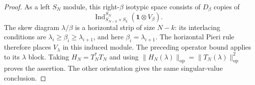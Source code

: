 \begin{proof}
As a left $S_N$ module, this right-$\beta$ isotypic space consists
of $D_\beta$ copies of
\[
 \operatorname{Ind}_{S_{N-k}\times S_k}^{S_N}
                    (\mathbf1\otimes V_\beta).
\]
The skew diagram $\lambda/\beta$ is a horizontal strip of size
$N-k$: its interlacing conditions are
$\lambda_i\ge\beta_i\ge\lambda_{i+1}$, and here
$\beta_i=\lambda_{i+1}$.  The horizontal Pieri rule therefore
places $V_\lambda$ in this induced module.  The preceding operator
bound applies to its $\lambda$ block.  Taking
$H_N=T_N^*T_N$ and using
$\|H_N(\lambda)\|_{\mathrm{op}}=
\|T_N(\lambda)\|_{\mathrm{op}}^2$ proves the assertion.
The other orientation gives the same singular-value conclusion.
\end{proof}
